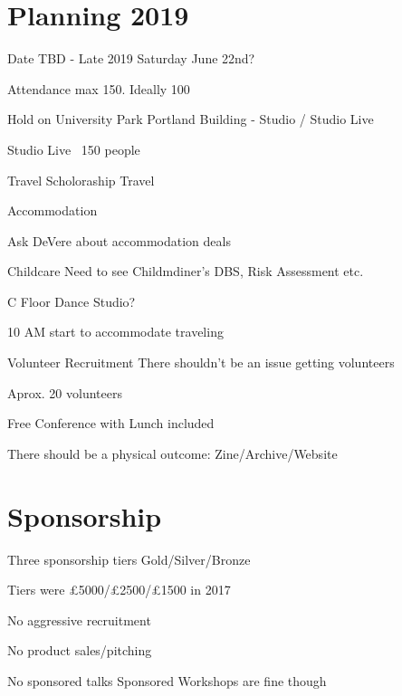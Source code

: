 \documentclass[11pt,hacksoc]{meetingmins}
\begin{document}
\section{Planning 2019}
\begin{items}

\item
Date TBD - Late 2019
	\subitem
	Saturday June 22nd?

\item
Attendance max 150. Ideally 100

\item
Hold on University Park
	\subitem
	Portland Building - Studio / Studio Live
	
	\subitem
	Studio Live ~150 people
	
\item
Travel Scholoraship
	\subitem
	Travel
	
	\subitem
	Accommodation
	
		\subsubitem
		Ask DeVere about accommodation deals
		
\item
Childcare
	\subitem
	Need to see Childmdiner's DBS, Risk Assessment etc.
	
	\subitem
	C Floor Dance Studio?
	
	
\item
10 AM start to accommodate traveling

\item
Volunteer Recruitment
	\subitem
	There shouldn't be an issue getting volunteers
	
	\subitem
	Aprox. 20 volunteers
	
\item
Free Conference with Lunch included

\item
There should be a physical outcome: Zine/Archive/Website

\end{items}

\section{Sponsorship}
\begin{items}

\item
Three sponsorship tiers
	\subitem
	Gold/Silver/Bronze
	
	\subitem
	Tiers were \pounds5000/\pounds2500/\pounds1500 in 2017
	
\item
No aggressive recruitment

\item
No product sales/pitching

\item
No sponsored talks
	\subitem
	Sponsored Workshops are fine though

	
\end{items}
\end{document}
